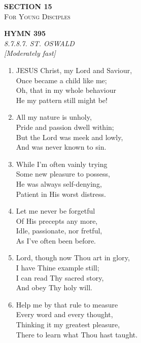 \documentclass[11pt,a4paper]{article}
\begin{document}
\newpage
\thispagestyle{empty}
\vspace*{3.5cm}
\begin{center}
    {\LARGE \textbf{SECTION 15}}\\[0.8em]
    {\Large \textsc{For Young Disciples}}
\end{center}
\vspace{3.5cm}

\newpage
\begin{center}
    {\Large \textbf{HYMN 395}}
    \\
    \textit{8.7.8.7. ST. OSWALD}
    \\
    \textit{\small [Moderately fast]}
\end{center}
\vspace{1em}

\begin{enumerate}
    \item JESUS Christ, my Lord and Saviour, \\
        Once became a child like me; \\
        Oh, that in my whole behaviour \\
        He my pattern still might be!

    \item All my nature is unholy, \\
        Pride and passion dwell within; \\
        But the Lord was meek and lowly, \\
        And was never known to sin.

    \item While I'm often vainly trying \\
        Some new pleasure to possess, \\
        He was always self-denying, \\
        Patient in His worst distress.

    \item Let me never be forgetful \\
        Of His precepts any more, \\
        Idle, passionate, nor fretful, \\
        As I've often been before.

    \item Lord, though now Thou art in glory, \\
        I have Thine example still; \\
        I can read Thy sacred story, \\
        And obey Thy holy will.

    \item Help me by that rule to measure \\
        Every word and every thought, \\
        Thinking it my greatest pleasure, \\
        There to learn what Thou hast taught.

\end{enumerate}
\end{document}
